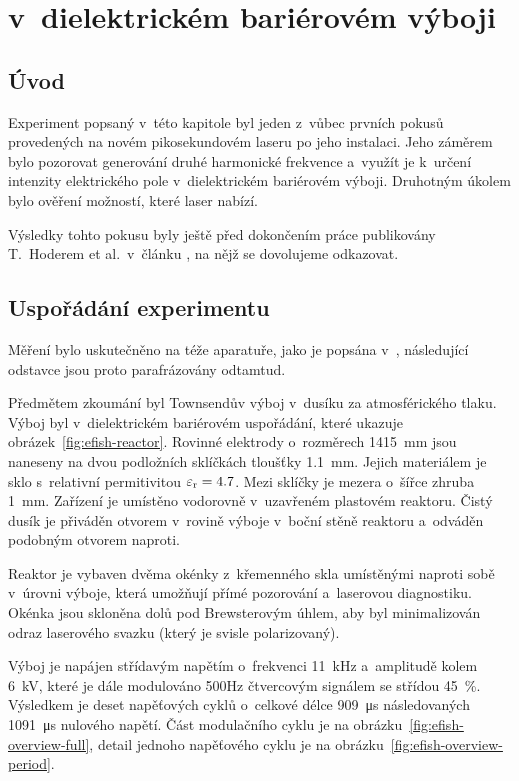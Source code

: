 \chapter[\EFISH]{{\EFISH} v~dielektrickém bariérovém výboji}

\newcommand\ypos{y}
\providecommand\efishmult{\alpha}
\providecommand\efishshift{P}

\section{Úvod}
\label{sec:efish-intro}
Experiment popsaný v~této kapitole byl jeden z~vůbec prvních pokusů
provedených na novém pikosekundovém laseru po jeho instalaci.
Jeho záměrem bylo pozorovat generování druhé harmonické frekvence
a~využít je k~určení intenzity elektrického pole v~dielektrickém
bariérovém výboji.
%
Druhotným úkolem bylo ověření možností, které laser nabízí.

Výsledky tohto pokusu byly ještě před dokončením práce publikovány
T.~Hoderem et al.~v~článku \cite{efish-nitrogen}, na nějž se dovolujeme
odkazovat.

\section{Uspořádání experimentu}
\label{sec:efish-setup}
Měření bylo uskutečněno na téže aparatuře, jako je popsána
v~\cite{efish-nitrogen},
následující odstavce jsou proto parafrázovány odtamtud.

Předmětem zkoumání byl Townsendův výboj v~dusíku za atmosférického tlaku.
Výboj byl v~dielektrickém bariérovém uspořádání, které ukazuje
obrázek~\ref{fig:efish-reactor}.
Rovinné elektrody o~rozměrech \num{14}\times\SI{15}{\milli\metre}
jsou naneseny na dvou podložních sklíčkách tloušťky \SI{1.1}{\milli\metre}.
Jejich materiálem je sklo s~relativní permitivitou ${\varepsilon_\text{r} = \num{4.7}}$.
Mezi sklíčky je mezera o~šířce zhruba \SI{1}{\milli\metre}.
Zařízení je umístěno vodorovně v~uzavřeném plastovém reaktoru.
Čistý dusík je přiváděn otvorem v~rovině výboje v~boční stěně reaktoru
a~odváděn podobným otvorem naproti.

Reaktor je vybaven dvěma okénky z~křemenného skla umístěnými naproti
sobě v~úrovni výboje,
která umožňují přímé pozorování a~laserovou diagnostiku.
Okénka jsou skloněna dolů pod Brewsterovým úhlem, aby byl minimalizován
odraz laserového svazku (který je svisle polarizovaný).

Výboj je napájen střídavým napětím o~frekvenci \SI{11}{\kilo\hertz}
a~amplitudě kolem \SI{6}{\kilo\volt},
které je dále modulováno \num{500}\si{\hertz} čtvercovým signálem
se střídou \SI{45}{\percent}.
Výsledkem je deset napěťových cyklů o~celkové délce \SI{909}{\micro\second}
následovaných \SI{1091}{\micro\second} nulového napětí.
\autocite{efish-nitrogen}
Část modulačního cyklu je na obrázku~\ref{fig:efish-overview-full},
detail jednoho napěťového cyklu je na obrázku~\ref{fig:efish-overview-period}.


